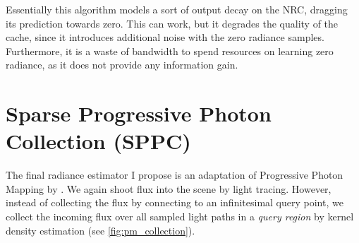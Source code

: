 Essentially this algorithm models a sort of output decay on the NRC, dragging its prediction towards zero.
This can work, but it degrades the quality of the cache, since it introduces additional noise with the zero radiance samples.
Furthermore, it is a waste of bandwidth to spend resources on learning zero radiance, as it does not provide any information gain.

\section{Sparse Progressive Photon Collection (SPPC)}
\label{sec:sppc}
The final radiance estimator I propose is an adaptation of Progressive Photon Mapping by \textcite{jensen1996,hachisuka2008}.
We again shoot flux into the scene by light tracing.
However, instead of collecting the flux by connecting to an infinitesimal query point, we collect the incoming flux over all sampled light paths in a \emph{query region} by kernel density estimation (see \cref{fig:pm_collection}).

